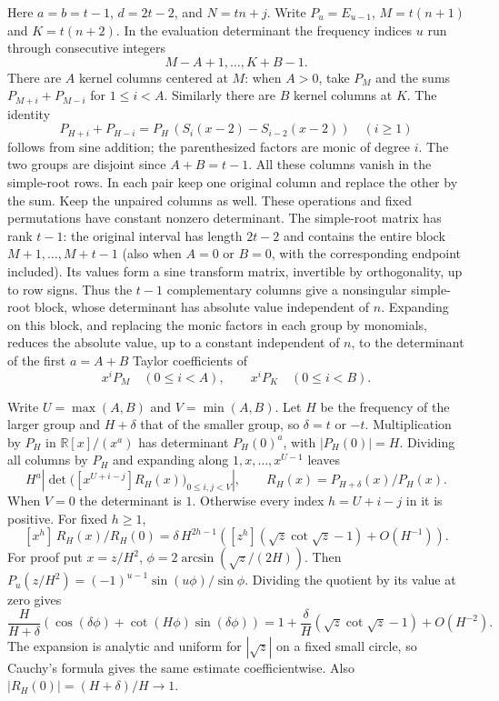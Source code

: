 \documentclass[11pt,a4paper]{article}
\theoremstyle{definition}\newtheorem{problem}[theorem]{Auxiliary problem}
\theoremstyle{remark}\newtheorem*{remark}{Remark}
\begin{document}
Here $a=b=t-1$, $d=2t-2$, and $N=tn+j$. Write $P_u=E_{u-1}$, $M=t(n+1)$ and $K=t(n+2)$. In the evaluation determinant the frequency indices $u$ run through consecutive integers
\[
M-A+1,\ldots,K+B-1.
\]
There are $A$ kernel columns centered at $M$: when $A>0$, take $P_M$ and the sums $P_{M+i}+P_{M-i}$ for $1\le i<A$. Similarly there are $B$ kernel columns at $K$. The identity
\[
P_{H+i}+P_{H-i}= P_H\,(S_i(x-2)-S_{i-2}(x-2))\quad(i\ge1)
\]
follows from sine addition; the parenthesized factors are monic of degree $i$. The two groups are disjoint since $A+B=t-1$. All these columns vanish in the simple-root rows. In each pair keep one original column and replace the other by the sum. Keep the unpaired columns as well. These operations and fixed permutations have constant nonzero determinant. The simple-root matrix has rank $t-1$: the original interval has length $2t-2$ and contains the entire block $M+1,\ldots,M+t-1$ (also when $A=0$ or $B=0$, with the corresponding endpoint included). Its values form a sine transform matrix, invertible by orthogonality, up to row signs. Thus the $t-1$ complementary columns give a nonsingular simple-root block, whose determinant has absolute value independent of $n$. Expanding on this block, and replacing the monic factors in each group by monomials, reduces the absolute value, up to a constant independent of $n$, to the determinant of the first $a=A+B$ Taylor coefficients of
\[
x^i P_M\quad(0\le i<A),\qquad x^i P_K\quad(0\le i<B).
\]

Write $U=\max(A,B)$ and $V=\min(A,B)$. Let $H$ be the frequency of the larger group and $H+\delta$ that of the smaller group, so $\delta=t$ or $-t$. Multiplication by $P_H$ in $\mathbb R[x]/(x^a)$ has determinant $P_H(0)^a$, with $|P_H(0)|=H$. Dividing all columns by $P_H$ and expanding along $1,x,\ldots,x^{U-1}$ leaves
\[
 H^a\left|\det\bigl([x^{U+i-j}]R_H(x)\bigr)_{0\le i,j<V}\right|,
 \qquad R_H(x)=P_{H+\delta}(x)/P_H(x).
\]
When $V=0$ the determinant is $1$. Otherwise every index $h=U+i-j$ in it is positive. For fixed $h\ge1$,
\[
 [x^h]\,R_H(x)/R_H(0)
 =\delta\,H^{2h-1}\left([z^h](\sqrt z\cot\sqrt z-1)+O(H^{-1})\right).
\]
For proof put $x=z/H^2$, $\phi=2\arcsin(\sqrt z/(2H))$. Then $P_u(z/H^2)=(-1)^{u-1}\sin(u\phi)/\sin\phi$. Dividing the quotient by its value at zero gives
\[
 \frac{H}{H+\delta}\left(\cos(\delta\phi)+\cot(H\phi)\sin(\delta\phi)\right)
 =1+\frac{\delta}{H}(\sqrt z\cot\sqrt z-1)+O(H^{-2}).
\]
The expansion is analytic and uniform for $|\sqrt z|$ on a fixed small circle, so Cauchy's formula gives the same estimate coefficientwise. Also $|R_H(0)|=(H+\delta)/H\to1$.
\end{document}
